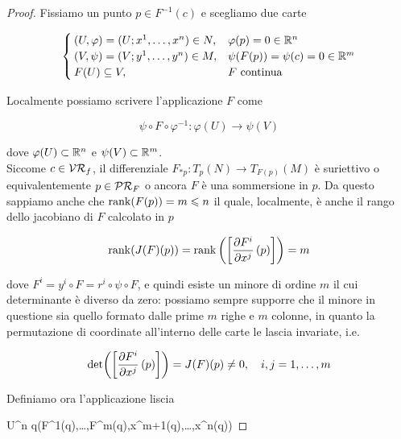 \begin{proof}
	Fissiamo un punto $ p \in F^{-1}(c) $ e scegliamo due carte
	
	\begin{equation}
		\begin{cases}
			(U,\varphi) = (U; x^{1},\dots,x^{n}) \in N, & \varphi(p) = 0 \in \mathbb{R}^{n} \\
			(V,\psi) = (V; y^{1},\dots,y^{n}) \in M, & \psi(F(p)) = \psi(c) = 0 \in \mathbb{R}^{m} \\
			F(U) \subseteq V, & F \text{ continua}
		\end{cases}
	\end{equation}
	

	Localmente possiamo scrivere l'applicazione $ F $ come
	
	\begin{equation}
		\psi \circ F \circ \varphi^{-1} : \varphi(U) \to \psi(V)
	\end{equation}

	dove $ \varphi(U) \subset \mathbb{R}^{n} $ e $ \psi(V) \subset \mathbb{R}^{m} $. \\
	Siccome $ c \in \mathcal{VR}_{f} $, il differenziale $ F_{*p} : T_{p}(N) \to T_{F(p)}(M) $ è suriettivo o equivalentemente $ p \in \mathcal{PR}_{F} $ o ancora $ F $ è una sommersione in $ p $. Da questo sappiamo anche che $ \rank(F(p)) = m \leqslant n $ il quale, localmente, è anche il rango dello jacobiano di $ F $ calcolato in $ p $
	
	\begin{equation}
		\rank(J(F)(p)) = \rank \left( \left[ \pdv{F^{i}}{x^{j}} \, (p) \right] \right) = m
	\end{equation}

	dove $ F^{i} = y^{i} \circ F = r^{i} \circ \psi \circ F $, e quindi esiste un minore di ordine $ m $ il cui determinante è diverso da zero: possiamo sempre supporre che il minore in questione sia quello formato dalle prime $ m $ righe e $ m $ colonne, in quanto la permutazione di coordinate all'interno delle carte le lascia invariate, i.e.
	
	\begin{equation}
		\det( \left[ \pdv{F^{i}}{x^{j}} \, (p) \right] ) = J(F)(p) \neq 0 \qcomma i,j=1,\dots,m
	\end{equation}

	Definiamo ora l'applicazione liscia
	
		{U}{\R^{n}}
		{q}{(F^{1}(q),\dots,F^{m}(q),x^{m+1}(q),\dots,x^{n}(q))}


\end{proof}
